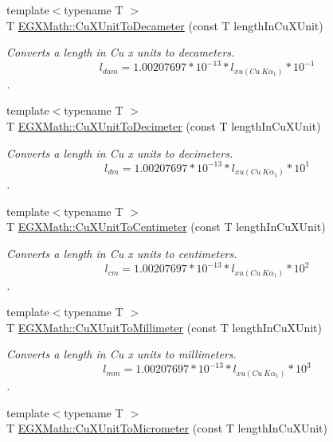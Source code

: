 \begin{DoxyCompactItemize}
{\footnotesize template$<$typename T $>$ }\\T \mbox{\hyperlink{group___e_g_x_math-_conversions-_length_conversions-_non-_s_i-_cu_x_unit-_s_i_ga6cf28db3962415cbd82d90f2df49a8e2}{E\+G\+X\+Math\+::\+Cu\+X\+Unit\+To\+Decameter}} (const T length\+In\+Cu\+X\+Unit)
\begin{DoxyCompactList}\small\item\em Converts a length in Cu x units to decameters. \[ l_{dam}=1.00207697*10^{-13} * l_{xu(Cu\ K\alpha_1)} * 10^{-1} \]. \end{DoxyCompactList}\item 
{\footnotesize template$<$typename T $>$ }\\T \mbox{\hyperlink{group___e_g_x_math-_conversions-_length_conversions-_non-_s_i-_cu_x_unit-_s_i_gaef88f4d943df6afdb7eec812534dead9}{E\+G\+X\+Math\+::\+Cu\+X\+Unit\+To\+Decimeter}} (const T length\+In\+Cu\+X\+Unit)
\begin{DoxyCompactList}\small\item\em Converts a length in Cu x units to decimeters. \[ l_{dm}=1.00207697*10^{-13} * l_{xu(Cu\ K\alpha_1)} * 10^{1} \]. \end{DoxyCompactList}\item 
{\footnotesize template$<$typename T $>$ }\\T \mbox{\hyperlink{group___e_g_x_math-_conversions-_length_conversions-_non-_s_i-_cu_x_unit-_s_i_gac30da492d2b67c1d9c3587bdcf84e370}{E\+G\+X\+Math\+::\+Cu\+X\+Unit\+To\+Centimeter}} (const T length\+In\+Cu\+X\+Unit)
\begin{DoxyCompactList}\small\item\em Converts a length in Cu x units to centimeters. \[ l_{cm}=1.00207697*10^{-13} * l_{xu(Cu\ K\alpha_1)} * 10^{2} \]. \end{DoxyCompactList}\item 
{\footnotesize template$<$typename T $>$ }\\T \mbox{\hyperlink{group___e_g_x_math-_conversions-_length_conversions-_non-_s_i-_cu_x_unit-_s_i_gabc336b44c0573fa86306811f1c5a15b9}{E\+G\+X\+Math\+::\+Cu\+X\+Unit\+To\+Millimeter}} (const T length\+In\+Cu\+X\+Unit)
\begin{DoxyCompactList}\small\item\em Converts a length in Cu x units to millimeters. \[ l_{mm}=1.00207697*10^{-13} * l_{xu(Cu\ K\alpha_1)} * 10^{3} \]. \end{DoxyCompactList}\item 
{\footnotesize template$<$typename T $>$ }\\T \mbox{\hyperlink{group___e_g_x_math-_conversions-_length_conversions-_non-_s_i-_cu_x_unit-_s_i_gaff5d323918d6135f9e7643a5c6a17414}{E\+G\+X\+Math\+::\+Cu\+X\+Unit\+To\+Micrometer}} (const T length\+In\+Cu\+X\+Unit)

\end{DoxyCompactItemize}
